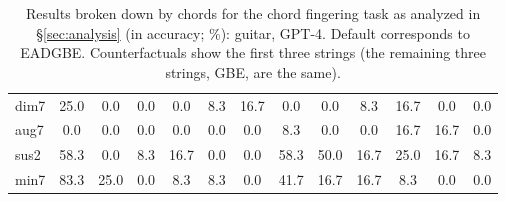 \begin{table}[t!]
\begin{tabular}{lcccccccccccc}
    dim7 & 25.0 & \phantom{0}0.0 & \phantom{0}0.0 & \phantom{0}0.0 & \phantom{0}8.3 & 16.7 & \phantom{0}0.0 & \phantom{0}0.0 & \phantom{0}8.3 & 16.7 & \phantom{0}0.0 & \phantom{0}0.0 \\
    aug7 & \phantom{0}0.0 & \phantom{0}0.0 & \phantom{0}0.0 & \phantom{0}0.0 & \phantom{0}0.0 & \phantom{0}0.0 & \phantom{0}8.3 & \phantom{0}0.0 & \phantom{0}0.0 & 16.7 & 16.7 & \phantom{0}0.0 \\
    sus2 & 58.3 & \phantom{0}0.0 & \phantom{0}8.3 & 16.7 & \phantom{0}0.0 & \phantom{0}0.0 & 58.3 & 50.0 & 16.7 & 25.0 & 16.7 & \phantom{0}8.3 \\
    min7 & 83.3 & 25.0 & \phantom{0}0.0 & \phantom{0}8.3 & \phantom{0}8.3 & \phantom{0}0.0 & 41.7 & 16.7 & 16.7 & \phantom{0}8.3 & \phantom{0}0.0 & \phantom{0}0.0 \\
    \bottomrule
    \end{tabular}
    \caption{Results broken down by chords for the chord fingering task as analyzed in \S\ref{sec:analysis} (in accuracy; \%): guitar, GPT-4. Default corresponds to EADGBE. Counterfactuals show the first three strings (the remaining three strings, GBE, are the same).
    }
\end{table}

